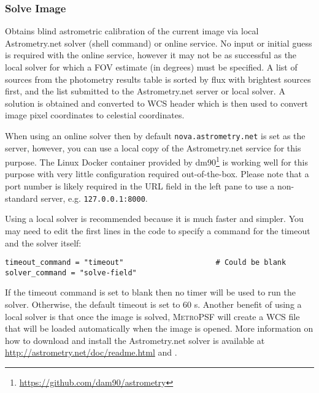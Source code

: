 \documentclass{article}
\begin{document}
\subsubsection{Solve Image}
Obtains blind astrometric calibration of the current image via local Astrometry.net solver (shell command) or online service. No input or initial guess is required with the online service, however it may not be as successful as the local solver for which a FOV estimate (in degrees) must be specified. A list of sources from the photometry results table is sorted by flux with brightest sources first, and the list submitted to the Astrometry.net server or local solver. A solution is obtained and converted to WCS header which is then used to convert image pixel coordinates to celestial coordinates. 

When using an online solver then by default \texttt{nova.astrometry.net} is set as the server, however, you can use a local copy of the Astrometry.net service for this purpose.  The Linux Docker container provided by dm90\footnote{\url{https://github.com/dam90/astrometry}} is working well for this purpose with very little configuration required out-of-the-box. Please note that a port number is likely required in the URL field in the left pane to use a non-standard server, e.g. \texttt{127.0.0.1:8000}.

Using a local solver is recommended because it is much faster and simpler. You may need to edit the first lines in the code to specify a command for the timeout and the solver itself:

\begin{verbatim}
timeout_command = "timeout"                     # Could be blank
solver_command = "solve-field"
\end{verbatim}

If the timeout command is set to blank then no timer will be used to run the solver. Otherwise, the default timeout is set to 60 s. Another benefit of using a local solver is that once the image is solved, \textsc{MetroPSF} will create a WCS file that will be loaded automatically when the image is opened. More information on how to download and install the Astrometry.net solver is available at \url{http://astrometry.net/doc/readme.html} and \citet{2010AJ....139.1782L}. 
\end{document}
